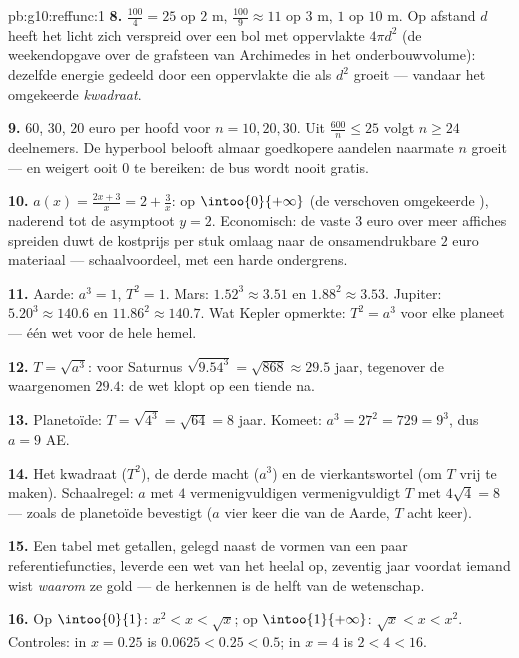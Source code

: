 \begin{solution}{pb:g10:reffunc:1}
\textbf{8.} $\frac{100}{4} = 25$ op $2$ m, $\frac{100}{9} \approx 11$ op
$3$ m, $1$ op $10$ m. Op afstand $d$ heeft het licht zich verspreid over een
bol met oppervlakte $4\pi d^2$ (de weekendopgave over de grafsteen van
Archimedes in het onderbouwvolume): dezelfde energie gedeeld door een
oppervlakte die als $d^2$ groeit --- vandaar het omgekeerde \emph{kwadraat}.

\textbf{9.} $60$, $30$, $20$ euro per hoofd voor $n = 10, 20, 30$. Uit
$\frac{600}{n} \leq 25$ volgt $n \geq 24$ deelnemers. De hyperbool belooft
almaar goedkopere aandelen naarmate $n$ groeit --- en weigert ooit $0$ te
bereiken: de bus wordt nooit gratis.

\textbf{10.} $a(x) = \frac{2x + 3}{x} = 2 + \frac3x$:  op
$\intoo{0}{+\infty}$ (de verschoven omgekeerde ), naderend tot de
asymptoot $y = 2$. Economisch: de vaste $3$ euro over meer affiches
spreiden duwt de kostprijs per stuk omlaag naar de onsamendrukbare $2$ euro
materiaal --- schaalvoordeel, met een harde ondergrens.

\textbf{11.} Aarde: $a^3 = 1$, $T^2 = 1$. Mars: $1.52^3 \approx 3.51$ en
$1.88^2 \approx 3.53$. Jupiter: $5.20^3 \approx 140.6$ en
$11.86^2 \approx 140.7$. Wat Kepler opmerkte: $T^2 = a^3$ voor elke planeet
--- één wet voor de hele hemel.

\textbf{12.} $T = \sqrt{a^3}$: voor Saturnus
$\sqrt{9.54^3} = \sqrt{868} \approx 29.5$ jaar, tegenover de waargenomen
$29.4$: de wet klopt op een tiende na.

\textbf{13.} Planetoïde: $T = \sqrt{4^3} = \sqrt{64} = 8$ jaar. Komeet:
$a^3 = 27^2 = 729 = 9^3$, dus $a = 9$ AE.

\textbf{14.} Het kwadraat ($T^2$), de derde macht ($a^3$) en de
vierkantswortel (om $T$ vrij te maken). Schaalregel: $a$ met $4$
vermenigvuldigen vermenigvuldigt $T$ met $4\sqrt4 = 8$ --- zoals de
planetoïde bevestigt ($a$ vier keer die van de Aarde, $T$ acht keer).

\textbf{15.} Een tabel met getallen, gelegd naast de vormen van een paar
referentiefuncties, leverde een wet van het heelal op, zeventig jaar voordat
iemand wist \emph{waarom} ze gold --- de  herkennen is de helft van
de wetenschap.

\textbf{16.} Op $\intoo{0}{1}$: $x^2 < x < \sqrt x$; op
$\intoo{1}{+\infty}$: $\sqrt x < x < x^2$. Controles: in $x = 0.25$ is
$0.0625 < 0.25 < 0.5$; in $x = 4$ is $2 < 4 < 16$.


\end{solution}
